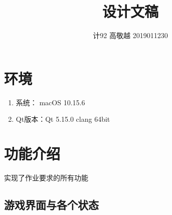 \documentclass[utf-8]{ctexart}
\title{设计文稿}
\author{计92 高敬越 2019011230}
\begin{document}
    \maketitle
    \section{环境}
    \begin{enumerate}
        \item 系统： macOS 10.15.6
        \item Qt版本：Qt 5.15.0 clang 64bit 
    \end{enumerate}
    \section{功能介绍}
    实现了作业要求的所有功能
    \subsection{游戏界面与各个状态}
\end{document}
